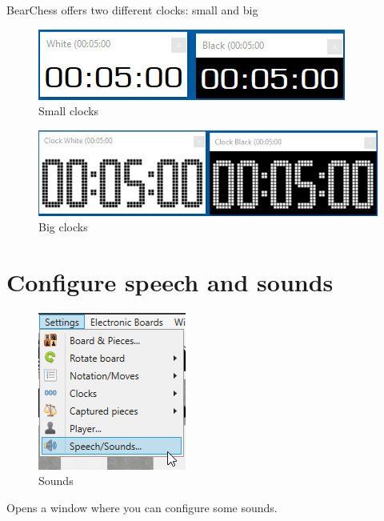 \documentclass[11pt,a4paper]{article}
\begin{document}
BearChess offers two different clocks: small and big

\begin{figure}[H]
	\centering
	\includegraphics[scale=1.0]{SmallClocks.png}
	\caption{Small clocks }
	\label{fig:SmallClocks}
\end{figure}
\begin{figure}[H]
	\centering
	\includegraphics[scale=0.8]{BigClocks.png}
	\caption{Big clocks }
	\label{fig:BigClocks}
\end{figure}

\section{Configure speech and sounds}

\begin{figure}[H]
	\centering
	\includegraphics[scale=1.0]{Sounds2.png}
	\caption{Sounds }
	\label{fig:Sounds2}
\end{figure}
Opens a window where you can configure some sounds.
\end{document}
